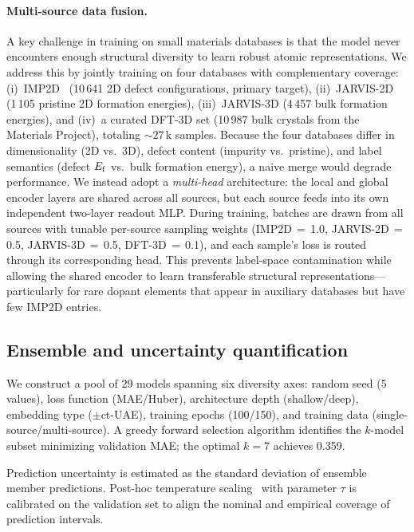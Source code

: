 \paragraph{Multi-source data fusion.}
A key challenge in training on small materials databases is that the model
never encounters enough structural diversity to learn robust atomic
representations.
We address this by jointly training on four databases with complementary
coverage:
(i)~IMP2D~\cite{imp2d2023} (10\,641 2D defect configurations, primary
target),
(ii)~JARVIS-2D (1\,105 pristine 2D formation energies),
(iii)~JARVIS-3D (4\,457 bulk formation energies), and
(iv)~a curated DFT-3D set (10\,987 bulk crystals from the Materials
Project), totaling ${\sim}27$\,k samples.
%
Because the four databases differ in dimensionality (2D vs.\ 3D),
defect content (impurity vs.\ pristine), and label semantics (defect
$E_\mathrm{f}$ vs.\ bulk formation energy), a naive merge would degrade
performance.
We instead adopt a \emph{multi-head} architecture: the local and global
encoder layers are shared across all sources, but each source feeds into
its own independent two-layer readout MLP.
During training, batches are drawn from all sources with tunable
per-source sampling weights (IMP2D\,$=$\,1.0, JARVIS-2D\,$=$\,0.5,
JARVIS-3D\,$=$\,0.5, DFT-3D\,$=$\,0.1), and each sample's loss is
routed through its corresponding head.
This prevents label-space contamination while allowing the shared encoder
to learn transferable structural representations---particularly for
rare dopant elements that appear in auxiliary databases but have few
IMP2D entries.

\subsection{Ensemble and uncertainty quantification}\label{sec:uq_method}

We construct a pool of 29 models spanning six diversity axes: random seed
(5 values), loss function (MAE/Huber), architecture depth (shallow/deep),
embedding type ($\pm$ct-UAE), training epochs (100/150), and training data
(single-source/multi-source).
A greedy forward selection algorithm identifies the $k$-model subset
minimizing validation MAE; the optimal $k=7$ achieves 0.359\eV{}.

Prediction uncertainty is estimated as the standard deviation of ensemble
member predictions.
Post-hoc temperature scaling~\cite{guo2017} with parameter $\tau$ is
calibrated on the validation set to align the nominal and empirical coverage
of prediction intervals.

